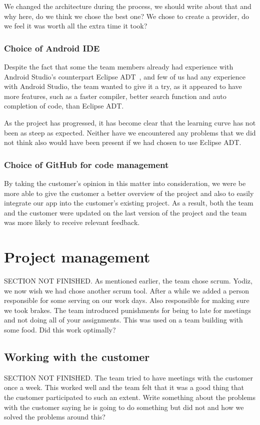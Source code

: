 We changed the architecture during the process, we should write about that and why here, do we think we chose the best one? We chose to create a provider, do we feel it was worth all the extra time it took? 

\subsubsection{Choice of Android IDE}
Despite the fact that some the team members already had experience with Android Studio's counterpart Eclipse ADT~\cite{eclipseadt}, and few of us had any experience with Android Studio, the team wanted to give it a try, as it appeared to have more features, such as a faster compiler, better search function and auto completion of code, than Eclipse ADT. 

As the project has progressed, it has become clear that the learning curve has not been as steep as expected. Neither have we encountered any problems that we did not think also would have been present if we had chosen to use Eclipse ADT.

\subsubsection{Choice of GitHub for code management}
By taking the customer's opinion in this matter into consideration, we were be more able to give the customer a better overview of the project and also to easily integrate our app into the customer's existing project. As a result, both the team and the customer were updated on the last version of the project and the team was more likely to receive relevant feedback. 

\section{Project management}
SECTION NOT FINISHED. As mentioned earlier, the team chose scrum. Yodiz, we now wish we had chose another scrum tool. After a while we added a person responsible for some serving on our work days. Also responsible for making sure we took brakes. 
The team introduced punishments for being to late for meetings and not doing all of your assignments. This was used on a team building with some food. Did this work optimally?
\subsection{Working with the customer}
SECTION NOT FINISHED. The team tried to have meetings with the customer once a week. This worked well and the team felt that it was a good thing that the customer participated to such an extent. Write something about the problems with the customer saying he is going to do something but did not and how we solved the problems around this?

